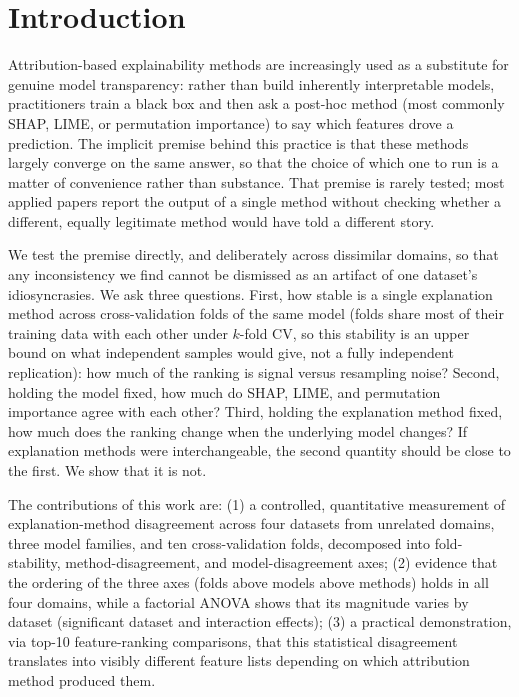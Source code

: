\documentclass[11pt,twoside,a4paper]{article}
\begin{document}
\section{Introduction}

Attribution-based explainability methods are increasingly used as a substitute for genuine model transparency: rather than build inherently interpretable models, practitioners train a black box and then ask a post-hoc method (most commonly SHAP, LIME, or permutation importance) to say which features drove a prediction. The implicit premise behind this practice is that these methods largely converge on the same answer, so that the choice of which one to run is a matter of convenience rather than substance. That premise is rarely tested; most applied papers report the output of a single method without checking whether a different, equally legitimate method would have told a different story.

We test the premise directly, and deliberately across dissimilar domains, so that any inconsistency we find cannot be dismissed as an artifact of one dataset's idiosyncrasies. We ask three questions. First, how stable is a single explanation method across cross-validation folds of the same model (folds share most of their training data with each other under $k$-fold CV, so this stability is an upper bound on what independent samples would give, not a fully independent replication): how much of the ranking is signal versus resampling noise? Second, holding the model fixed, how much do SHAP, LIME, and permutation importance agree with each other? Third, holding the explanation method fixed, how much does the ranking change when the underlying model changes? If explanation methods were interchangeable, the second quantity should be close to the first. We show that it is not.

The contributions of this work are: (1) a controlled, quantitative measurement of explanation-method disagreement across four datasets from unrelated domains, three model families, and ten cross-validation folds, decomposed into fold-stability, method-disagreement, and model-disagreement axes; (2) evidence that the ordering of the three axes (folds above models above methods) holds in all four domains, while a factorial ANOVA shows that its magnitude varies by dataset (significant dataset and interaction effects); (3) a practical demonstration, via top-10 feature-ranking comparisons, that this statistical disagreement translates into visibly different feature lists depending on which attribution method produced them.
\end{document}
